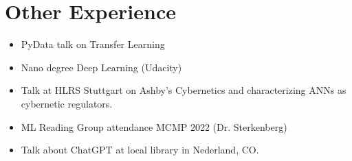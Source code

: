 \documentclass[11pt, oneside]{article}   	%
\begin{document}
\section{Other Experience}

\begin{multicols}{2}
\begin{itemize}
\item PyData talk on Transfer Learning
\item Nano degree Deep Learning (Udacity)
\item Talk at HLRS Stuttgart on Ashby's Cybernetics and characterizing ANNs as cybernetic regulators.
\item ML Reading Group attendance MCMP 2022 (Dr. Sterkenberg)
\item Talk about ChatGPT at local library in Nederland, CO.
\end{itemize}
\end{multicols}



\end{document}

